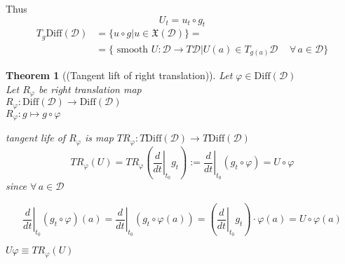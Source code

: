 \documentclass[twoside,landscape,10pt]{amsart}
\theoremstyle{plain}
\newtheorem{theorem}{Theorem}
\theoremstyle{definition}
\theoremstyle{remark}
\theoremstyle{remark}
\begin{document}
\begin{multicols*}{2}

Thus
\[
U_t = u_t \circ g_t
\]
\begin{equation}
  \begin{aligned}
    T_g\text{Diff}(\mathcal{D}) & = \lbrace u \circ g | u \in \mathfrak{X}(\mathcal{D}) \rbrace = \\
    & = \lbrace \text{ smooth } U : \mathcal{D} \to T \mathcal{D} | U(a) \in T_{g(a)}\mathcal{D} \quad \, \forall \, a \in \mathcal{D} \rbrace
\end{aligned}
\end{equation}

\begin{theorem}[(Tangent lift of right translation)]
  Let $\varphi \in \text{Diff}(\mathcal{D})$ \\
Let $R_{\varphi}$ be right translation map \\
\phantom{Let } $ R_{\varphi}: \text{Diff}(\mathcal{D}) \to \text{Diff}(\mathcal{D}) $\\
\phantom{Let } $ R_{\varphi}: g \mapsto g\circ \varphi$ 

tangent life of $R_{\varphi}$ is map $TR_{\varphi} : T\text{Diff}(\mathcal{D}) \to T\text{Diff}(\mathcal{D})$
\begin{equation}
  TR_{\varphi}(U) = TR_{\varphi} \left( \left. \frac{d}{dt} \right|_{t_0} g_t \right) := \left. \frac{d}{dt} \right|_{t_0} (g_t \circ \varphi) = U\circ \varphi
\end{equation}
since $\forall \, a \in \mathcal{D}$

\begin{equation}
  \left. \frac{d}{dt} \right|_{t_0} (g_t \circ \varphi)(a) = \left. \frac{d}{dt} \right|_{t_0} (g_t \circ \varphi(a)) = \left( \left. \frac{d}{dt} \right|_{t_0} g_t \right) \cdot \varphi(a) = U\circ \varphi(a)
\end{equation}

$U\varphi \equiv TR_{\varphi}(U)$


\end{theorem}
\end{multicols*}
\end{document}
